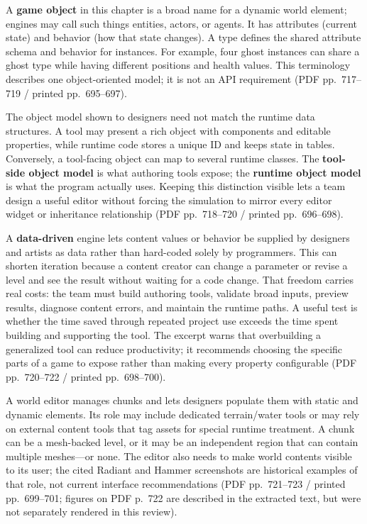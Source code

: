 A \textbf{game object} in this chapter is a broad name for a dynamic world element; engines may call such things entities, actors, or agents. It has attributes (current state) and behavior (how that state changes). A type defines the shared attribute schema and behavior for instances. For example, four ghost instances can share a ghost type while having different positions and health values. This terminology describes one object-oriented model; it is not an API requirement (PDF pp.~717--719 / printed pp.~695--697).

The object model shown to designers need not match the runtime data structures. A tool may present a rich object with components and editable properties, while runtime code stores a unique ID and keeps state in tables. Conversely, a tool-facing object can map to several runtime classes. The \textbf{tool-side object model} is what authoring tools expose; the \textbf{runtime object model} is what the program actually uses. Keeping this distinction visible lets a team design a useful editor without forcing the simulation to mirror every editor widget or inheritance relationship (PDF pp.~718--720 / printed pp.~696--698).

A \textbf{data-driven} engine lets content values or behavior be supplied by designers and artists as data rather than hard-coded solely by programmers. This can shorten iteration because a content creator can change a parameter or revise a level and see the result without waiting for a code change. That freedom carries real costs: the team must build authoring tools, validate broad inputs, preview results, diagnose content errors, and maintain the runtime paths. A useful test is whether the time saved through repeated project use exceeds the time spent building and supporting the tool. The excerpt warns that overbuilding a generalized tool can reduce productivity; it recommends choosing the specific parts of a game to expose rather than making every property configurable (PDF pp.~720--722 / printed pp.~698--700).

A world editor manages chunks and lets designers populate them with static and dynamic elements. Its role may include dedicated terrain/water tools or may rely on external content tools that tag assets for special runtime treatment. A chunk can be a mesh-backed level, or it may be an independent region that can contain multiple meshes---or none. The editor also needs to make world contents visible to its user; the cited Radiant and Hammer screenshots are historical examples of that role, not current interface recommendations (PDF pp.~721--723 / printed pp.~699--701; figures on PDF p.~722 are described in the extracted text, but were not separately rendered in this review).

